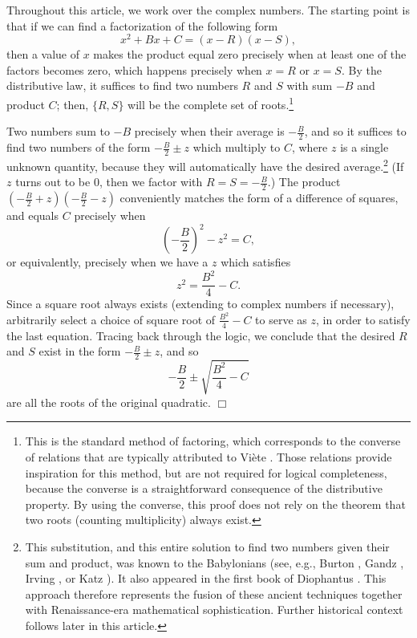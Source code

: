 Throughout this article, we work over the complex numbers. The starting point is
that if we can find a factorization of the following form
\begin{equation}
  \label{eq:monic}
  x^2 + Bx + C = (x-R)(x-S),
\end{equation}
then a value of $x$ makes the product equal zero precisely when at least one of
the factors becomes zero, which happens precisely when $x = R$ or $x = S$. By
the distributive law, it suffices to find two numbers $R$ and $S$ with sum $-B$
and product $C$; then, $\{R, S\}$ will be the complete set of
roots.\footnote{This is the standard method of factoring, which corresponds to
  the converse of relations that are typically attributed to Vi\`ete
  \cite{viete}. Those relations provide inspiration for this method, but are not
  required for logical completeness, because the converse is a straightforward
  consequence of the distributive property. By using the converse, this proof
  does not rely on the theorem that two roots (counting multiplicity) always
exist.}

Two numbers sum to $-B$ precisely when their average is $-\frac{B}{2}$, and so
it suffices to find two numbers of the form $-\frac{B}{2} \pm z$ which multiply
to $C$, where $z$ is a single unknown quantity, because they will automatically
have the desired average.\footnote{This substitution, and this entire solution
  to find two numbers given their sum and product, was known to the Babylonians
  (see, e.g., Burton \cite{burton}, Gandz \cite{gandz-1937}, Irving
  \cite{irving}, or Katz \cite{katz}). It also appeared in the first book of
  Diophantus \cite{diophantus}. This approach therefore represents the fusion of
  these ancient techniques together with Renaissance-era mathematical
  sophistication.  Further historical context follows later in this article.}
(If $z$ turns out to be 0, then we factor with $R = S = -\frac{B}{2}$.) The
product $(-\frac{B}{2} + z)(-\frac{B}{2} - z)$ conveniently matches the form
of a difference of squares, and equals $C$ precisely when
\begin{displaymath}
  \left( -\frac{B}{2} \right)^2 - z^2 = C,
\end{displaymath}
or equivalently, precisely when we have a $z$ which satisfies
\begin{displaymath}
  z^2 = \frac{B^2}{4} - C.
\end{displaymath}
Since a square root always exists (extending to complex numbers if necessary),
arbitrarily select a choice of square root of $\frac{B^2}{4} - C$ to serve as
$z$, in order to satisfy the last equation. Tracing back through the logic, we
conclude that the desired $R$ and $S$ exist in the form $-\frac{B}{2} \pm z$,
and so
\begin{equation}
  \label{eq:formula-monic}
  -\frac{B}{2} \pm \sqrt{\frac{B^2}{4} - C}
\end{equation}
are all the roots of the original quadratic.
\hfill $\Box$

